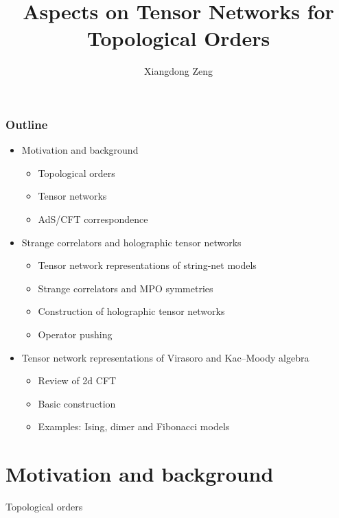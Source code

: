 \documentclass{fdubeamer}
\title{Aspects on Tensor Networks for Topological Orders}
\author{Xiangdong Zeng}
\institute{Supervisor: Prof.\ Ling-Yan Hung}
\begin{document}
\maketitle

\begin{frame}

\frametitle{Outline}

\begin{itemize}
  \item Motivation and background

    \begin{itemize}
      \item Topological orders
      \item Tensor networks
      \item AdS/CFT correspondence
    \end{itemize}

  \item Strange correlators and holographic tensor networks

    \begin{itemize}
      \item Tensor network representations of string-net models
      \item Strange correlators and MPO symmetries
      \item Construction of holographic tensor networks
      \item Operator pushing
    \end{itemize}

  \item Tensor network representations of Virasoro and Kac--Moody algebra

    \begin{itemize}
      \item Review of 2d CFT
      \item Basic construction
      \item Examples: Ising, dimer and Fibonacci models
    \end{itemize}
\end{itemize}

\end{frame}

\section{Motivation and background}

\begin{frame}{Topological orders}
\end{frame}
\end{document}
